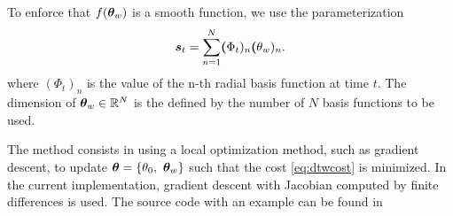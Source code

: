 To enforce that $f(\boldsymbol{\theta}_w)$ is a smooth function, we use the parameterization
\begin{equation}
	\boldsymbol{s}_t = \sum_{n=1}^N  \boldsymbol{(}\Phi_t)_n \boldsymbol{(}\theta_w)_n.
	\label{eq:st}
\end{equation}
where $(\Phi_t)_n$ is the value of the n-th radial basis function at time $t$. 
The dimension of $\boldsymbol{\theta}_w \in \mathbb{R}^{N}$ is the defined by the number of $N$ basis functions to be used.


The method consists in using a local optimization method, such as gradient descent, to update $\boldsymbol{\theta} = \{\theta_0, \ \boldsymbol{\theta}_w\}$ such that the cost 	\eqref{eq:dtwcost} is minimized.
In the current implementation, gradient descent with Jacobian computed by finite differences is used.
The source code with an example can be found in


%
%


